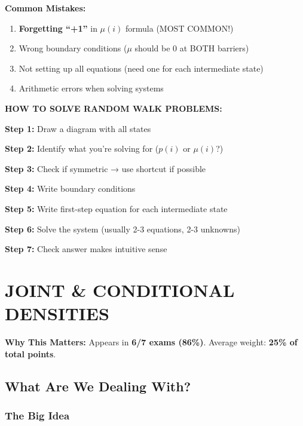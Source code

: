 \documentclass[10pt,letterpaper]{article}
\begin{document}
\begin{warningbox}
\textbf{Common Mistakes:}
\begin{enumerate}
  \item \textbf{Forgetting ``+1''} in $\mu(i)$ formula (MOST COMMON!)
  \item Wrong boundary conditions ($\mu$ should be 0 at BOTH barriers)
  \item Not setting up all equations (need one for each intermediate state)
  \item Arithmetic errors when solving systems
\end{enumerate}
\end{warningbox}

\begin{strategybox}
\textbf{HOW TO SOLVE RANDOM WALK PROBLEMS:}

\textbf{Step 1:} Draw a diagram with all states

\textbf{Step 2:} Identify what you're solving for ($p(i)$ or $\mu(i)$?)

\textbf{Step 3:} Check if symmetric → use shortcut if possible

\textbf{Step 4:} Write boundary conditions

\textbf{Step 5:} Write first-step equation for each intermediate state

\textbf{Step 6:} Solve the system (usually 2-3 equations, 2-3 unknowns)

\textbf{Step 7:} Check answer makes intuitive sense
\end{strategybox}

\newpage

\section{JOINT \& CONDITIONAL DENSITIES}

\begin{criticalbox}
\textbf{Why This Matters:} Appears in \textbf{6/7 exams (86\%)}. Average weight: \textbf{25\% of total points}.
\end{criticalbox}

\subsection{What Are We Dealing With?}

\subsubsection{The Big Idea}
\end{document}
